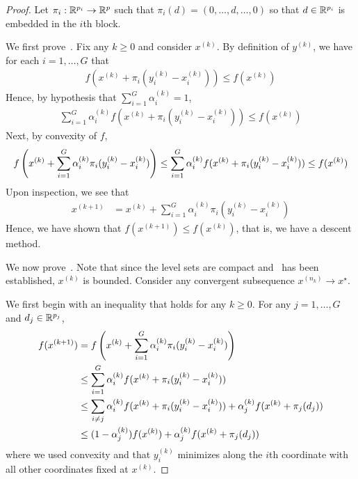 \begin{proof}

Let $\pi_i: \mathbb{R}^{p_i} \to \mathbb{R}^p$ such that $\pi_i(d) = (0,\ldots, d,\ldots, 0)$
so that $d \in \mathbb{R}^{p_i}$ is embedded in the $i$th block.

We first prove~.
Fix any $k\geq 0$ and consider $x^{(k)}$.
By definition of $y^{(k)}$, we have for each $i=1,\ldots, G$ that
\begin{align*}
    f(x^{(k)} + \pi_i(y_i^{(k)} - x_i^{(k)}))
    \leq
    f(x^{(k)})
\end{align*}
Hence, by hypothesis that $\sum\limits_{i=1}^G \alpha_i^{(k)} = 1$,
\begin{align*}
    \sum\limits_{i=1}^G 
    \alpha_i^{(k)}
    f(x^{(k)} + \pi_i(y_i^{(k)} - x_i^{(k)}))
    \leq
    f(x^{(k)})
\end{align*}
Next, by convexity of $f$, 
\begin{align*}
    f\left(
        x^{(k)}
        +
        \sum\limits_{i=1}^G
        \alpha_i^{(k)}
        \pi_i(y_i^{(k)} - x_i^{(k)})
    \right)
    \leq
    \sum\limits_{i=1}^G 
    \alpha_i^{(k)}
    f(x^{(k)} + \pi_i(y_i^{(k)} - x_i^{(k)}))
    \leq
    f(x^{(k)})
\end{align*}
Upon inspection, we see that
\begin{align*}
    x^{(k+1)}
    &=
    x^{(k)}
    +
    \sum\limits_{i=1}^G
    \alpha_i^{(k)}
    \pi_i(y_i^{(k)} - x_i^{(k)})
\end{align*}
Hence, we have shown that $f(x^{(k+1)}) \leq f(x^{(k)})$,
that is, we have a descent method.

We now prove~.
Note that since the level sets are compact 
and~ has been established, $x^{(k)}$ is bounded.
Consider any convergent subsequence $x^{(n_k)} \to x^\star$.

We first begin with an inequality that holds for any $k \geq 0$.
For any $j=1,\ldots, G$ and $d_j \in \mathbb{R}^{p_j}$,
\begin{align}
    f(x^{(k+1)})
    &=
    f\left(x^{(k)} + \sum\limits_{i=1}^G \alpha_i^{(k)} \pi_i(y_i^{(k)}-x_i^{(k)})\right)
    \nonumber
    \\&\leq
    \sum\limits_{i=1}^G
    \alpha_i^{(k)}
    f(x^{(k)} + \pi_i(y_i^{(k)}-x_i^{(k)}))
    \nonumber
    \\&\leq
    \sum\limits_{i\neq j}
    \alpha_i^{(k)}
    f(x^{(k)} + \pi_i(y_i^{(k)}-x_i^{(k)}))
    +
    \alpha_j^{(k)}
    f(x^{(k)} + \pi_j(d_j))
    \nonumber
    \\&\leq
    (1-\alpha_j^{(k)}) f(x^{(k)})
    + 
    \alpha_j^{(k)}
    f(x^{(k)} + \pi_j(d_j))
    \label{eq:thm:parallel-bcd:key-inequality}
\end{align}
where we used convexity and that $y_i^{(k)}$ minimizes along the $i$th coordinate
with all other coordinates fixed at $x^{(k)}$.


\end{proof}

